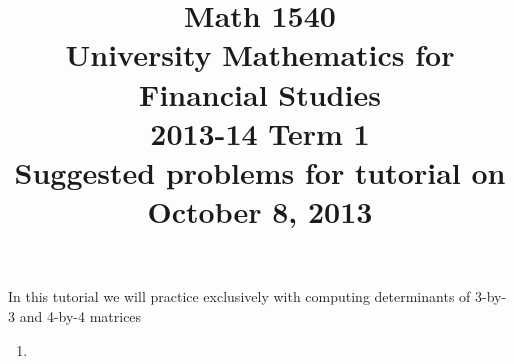 \documentclass[8pt]{article} %
\title{Math 1540\\University Mathematics for Financial Studies\\2013-14 Term 1\\Suggested problems for tutorial on\\October 8, 2013}
\begin{document}
\maketitle
In this tutorial we will practice exclusively with computing determinants of 3-by-3 and 4-by-4 matrices
\begin{enumerate}
	\newcommand{\myexplain}[3]{#1\xrightarrow{\text{#2}}#3}
	\newcommand{\myexplainf}[4]{#1\xrightarrow{\begin{subarray}{c}\text{#2}\\\text{#3}\end{subarray}}#4}
	\newcommand{\myfrac}[2]{^#1/_#2}
\item
\end{enumerate}
\end{document}
